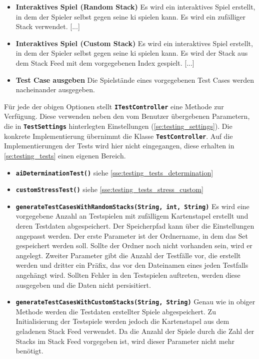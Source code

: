 \documentclass[
							a4paper, 
							11pt, 
							openany, 
							liststotoc,
							parskip=half, 
   							headings=normal
						]{scrreprt}
\begin{document}
{\begin{itemize}
\item \textbf{Interaktives Spiel (Random Stack)} Es wird ein interaktives Spiel erstellt, in dem der Spieler selbst gegen seine \acs{ki} spielen kann. Es wird ein zufälliger Stack verwendet. [...]
\item \textbf{Interaktives Spiel (Custom Stack)} Es wird ein interaktives Spiel erstellt, in dem der Spieler selbst gegen seine \acs{ki} spielen kann. Es wird der Stack aus dem Stack Feed mit dem vorgegebenen Index gespielt. [...]
\item \textbf{Test Case ausgeben} Die Spielstände eines vorgegebenen Test Cases werden nacheinander ausgegeben.
\end{itemize}\bigskip

Für jede der obigen Optionen stellt \textbf{\texttt{ITestController}} eine Methode zur Verfügung. Diese verwenden neben den vom Benutzer übergebenen Parametern, die in \textbf{\texttt{TestSettings}} hinterlegten Einstellungen (\autoref{se:testing_settings}). Die konkrete Implementierung übernimmt die Klasse \textbf{\texttt{Test\-Con\-trol\-ler}}. Auf die Implementierungen der Tests wird hier nicht eingegangen, diese erhalten in \autoref{se:testing_tests} einen eigenen Bereich.
\begin{itemize}
	\item \textbf{\texttt{aiDeterminationTest()}} siehe \autoref{sse:testing_tests_determination}
	\item \textbf{\texttt{customStressTest()}} siehe \autoref{sse:testing_tests_stress_custom}            
	\item \textbf{\texttt{generateTestCasesWithRandomStacks(String, int, String)}} Es wird eine vorgegebene Anzahl an Testspielen mit zufälligem Kartenstapel erstellt und deren Testdaten abgespeichert. Der Speicherpfad kann über die Einstellungen angepasst werden. Der erste Parameter ist der Ordnername, in dem das Set gespeichert werden soll. Sollte der Ordner noch nicht vorhanden sein, wird er angelegt. Zweiter Parameter gibt die Anzahl der Testfälle vor, die erstellt werden und dritter ein Präfix, das vor den Dateinamen eines jeden Testfalls angehängt wird. Sollten Fehler in den Testspielen auftreten, werden diese ausgegeben und die Daten nicht persisitiert.
	\item \textbf{\texttt{ge\-ne\-ra\-te\-Test\-Ca\-ses\-With\-Cus\-tom\-Stacks(String, String)}} Genau wie in
obiger\linebreak
Methode werden die Testdaten erstellter Spiele abgespeichert. Zu Initialisierung der Testspiele werden jedoch die Kartenstapel aus dem geladenen Stack Feed verwendet. Da die Anzahl der Spiele durch die Zahl der Stacks im Stack Feed vorgegeben ist, wird dieser Parameter nicht mehr benötigt.

\end{itemize}}
\end{document}
